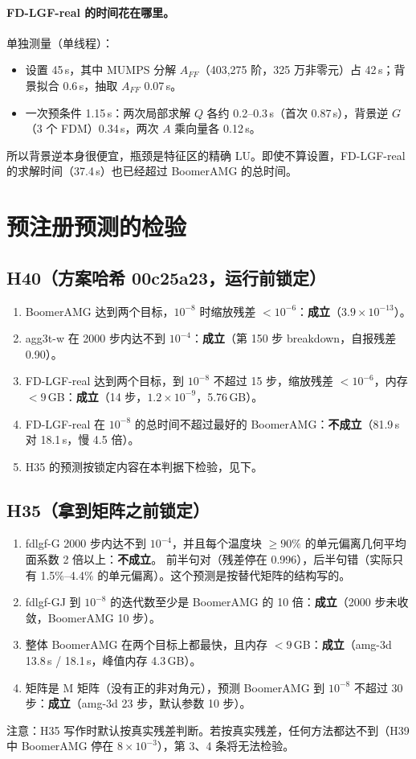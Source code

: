 \documentclass[11pt,a4paper]{ctexart}
\begin{document}
\paragraph{FD-LGF-real 的时间花在哪里。}单独测量（单线程）：
\begin{itemize}
\item 设置 45\,s，其中 MUMPS 分解 $A_{FF}$（403,275 阶，325 万非零元）占 42\,s；背景拟合 0.6\,s，抽取 $A_{FF}$ 0.07\,s。
\item 一次预条件 1.15\,s：两次局部求解 $Q$ 各约 0.2--0.3\,s（首次 0.87\,s），背景逆 $G$（3 个 FDM）0.34\,s，两次 $A$ 乘向量各 0.12\,s。
\end{itemize}
所以背景逆本身很便宜，瓶颈是特征区的精确 LU。即使不算设置，FD-LGF-real 的求解时间（37.4\,s）也已经超过 BoomerAMG 的总时间。

\section{预注册预测的检验}
\subsection*{H40（方案哈希 00c25a23，运行前锁定）}
\begin{enumerate}
\item BoomerAMG 达到两个目标，$10^{-8}$ 时缩放残差 $<10^{-6}$：\textbf{成立}（$3.9\times10^{-13}$）。
\item agg3t-w 在 2000 步内达不到 $10^{-4}$：\textbf{成立}（第 150 步 breakdown，自报残差 0.90）。
\item FD-LGF-real 达到两个目标，到 $10^{-8}$ 不超过 15 步，缩放残差 $<10^{-6}$，内存 $<9$\,GB：\textbf{成立}（14 步，$1.2\times10^{-9}$，5.76\,GB）。
\item FD-LGF-real 在 $10^{-8}$ 的总时间不超过最好的 BoomerAMG：\textbf{不成立}（81.9\,s 对 18.1\,s，慢 4.5 倍）。
\item H35 的预测按锁定内容在本判据下检验，见下。
\end{enumerate}
\subsection*{H35（拿到矩阵之前锁定）}
\begin{enumerate}
\item fdlgf-G 2000 步内达不到 $10^{-4}$，并且每个温度块 $\ge90\%$ 的单元偏离几何平均面系数 2 倍以上：\textbf{不成立}。
前半句对（残差停在 0.996），后半句错（实际只有 1.5\%--4.4\% 的单元偏离）。这个预测是按替代矩阵的结构写的。
\item fdlgf-GJ 到 $10^{-8}$ 的迭代数至少是 BoomerAMG 的 10 倍：\textbf{成立}（2000 步未收敛，BoomerAMG 10 步）。
\item 整体 BoomerAMG 在两个目标上都最快，且内存 $<9$\,GB：\textbf{成立}（amg-3d 13.8\,s / 18.1\,s，峰值内存 4.3\,GB）。
\item 矩阵是 M 矩阵（没有正的非对角元），预测 BoomerAMG 到 $10^{-8}$ 不超过 30 步：\textbf{成立}（amg-3d 23 步，默认参数 10 步）。
\end{enumerate}
注意：H35 写作时默认按真实残差判断。若按真实残差，任何方法都达不到（H39 中 BoomerAMG 停在 $8\times10^{-3}$），第 3、4 条将无法检验。
\end{document}
